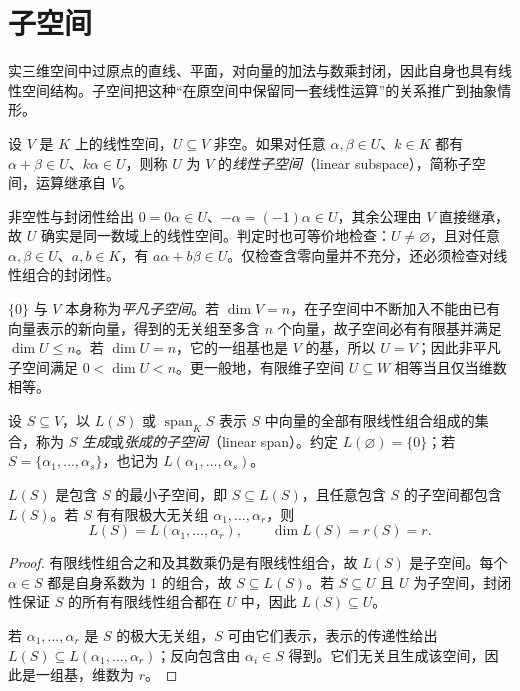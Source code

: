 \section{子空间}
\label{sec:linear-subspaces}

实三维空间中过原点的直线、平面，对向量的加法与数乘封闭，因此自身也具有线性空间结构。子空间把这种“在原空间中保留同一套线性运算”的关系推广到抽象情形。

\begin{definition}
\label{def:linear-subspace}
设 $V$ 是 $K$ 上的线性空间，$U\subseteq V$ 非空。如果对任意 $\alpha,\beta\in U$、$k\in K$ 都有 $\alpha+\beta\in U$、$k\alpha\in U$，则称 $U$ 为 $V$ 的\emph{线性子空间}（linear subspace），简称子空间，运算继承自 $V$。
\end{definition}

非空性与封闭性给出 $0=0\alpha\in U$、$-\alpha=(-1)\alpha\in U$，其余公理由 $V$ 直接继承，故 $U$ 确实是同一数域上的线性空间。判定时也可等价地检查：$U\ne\varnothing$，且对任意 $\alpha,\beta\in U$、$a,b\in K$，有 $a\alpha+b\beta\in U$。仅检查含零向量并不充分，还必须检查对线性组合的封闭性。

$\{0\}$ 与 $V$ 本身称为\emph{平凡子空间}。若 $\dim V=n$，在子空间中不断加入不能由已有向量表示的新向量，得到的无关组至多含 $n$ 个向量，故子空间必有有限基并满足 $\dim U\leq n$。若 $\dim U=n$，它的一组基也是 $V$ 的基，所以 $U=V$；因此非平凡子空间满足 $0<\dim U<n$。更一般地，有限维子空间 $U\subseteq W$ 相等当且仅当维数相等。

\begin{definition}
\label{def:span}
设 $S\subseteq V$，以 $L(S)$ 或 $\operatorname{span}_K S$ 表示 $S$ 中向量的全部有限线性组合组成的集合，称为 $S$ \emph{生成}或\emph{张成的子空间}（linear span）。约定 $L(\varnothing)=\{0\}$；若 $S=\{\alpha_1,\ldots,\alpha_s\}$，也记为 $L(\alpha_1,\ldots,\alpha_s)$。
\end{definition}

\begin{proposition}
\label{prop:span-minimal-subspace}
$L(S)$ 是包含 $S$ 的最小子空间，即 $S\subseteq L(S)$，且任意包含 $S$ 的子空间都包含 $L(S)$。若 $S$ 有有限极大无关组 $\alpha_1,\ldots,\alpha_r$，则
\[
    L(S)=L(\alpha_1,\ldots,\alpha_r),\qquad \dim L(S)=r(S)=r.
\]
\end{proposition}

\begin{proof}
有限线性组合之和及其数乘仍是有限线性组合，故 $L(S)$ 是子空间。每个 $\alpha\in S$ 都是自身系数为 $1$ 的组合，故 $S\subseteq L(S)$。若 $S\subseteq U$ 且 $U$ 为子空间，封闭性保证 $S$ 的所有有限线性组合都在 $U$ 中，因此 $L(S)\subseteq U$。

若 $\alpha_1,\ldots,\alpha_r$ 是 $S$ 的极大无关组，$S$ 可由它们表示，表示的传递性给出 $L(S)\subseteq L(\alpha_1,\ldots,\alpha_r)$；反向包含由 $\alpha_i\in S$ 得到。它们无关且生成该空间，因此是一组基，维数为 $r$。
\end{proof}

